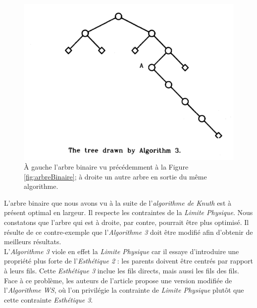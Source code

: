 \documentclass{article}
\begin{document}
\begin{figure}[h]
\begin{center}
\begin{left}
      		\end{left}
          \begin{right}
            \includegraphics[scale=0.4]{arbre3.png}
          \end{right}
        \end{center}
    	\caption{À gauche l'arbre binaire vu précédemment à la Figure \ref{fig:arbreBinaire}; à droite un autre arbre en sortie du même algorithme.  \cite{article79}}
      \label{fig:arbresAlgo3}
    \end{figure}
    \vfill


    L'arbre binaire que nous avons vu à la suite de l'\emph{algorithme de Knuth} est à présent optimal en largeur. Il respecte les contraintes de la \emph{Limite Physique}. Nous constatons que l'arbre qui est à droite, par contre, pourrait être plus optimisé. Il résulte de ce contre-exemple que l'\emph{Algorithme 3} doit être modifié afin d'obtenir de meilleurs résultats.\\
\newpage
    L'\emph{Algorithme 3} viole en effet la \emph{Limite Physique} car il essaye d'introduire une propriété plus forte de l'\emph{Esthétique 2} : les parents doivent être centrés par rapport à leurs fils.
    Cette \emph{Esthétique 3} inclue les fils directs, mais aussi les fils des fils.\\

    Face à ce problème, les auteurs de l'article \cite{article79} propose une version modifiée de l'\emph{Algorithme WS}, où l'on privilégie la contrainte de \emph{Limite Physique} plutôt que cette contrainte \emph{Esthétique 3}.\\
\end{document}
